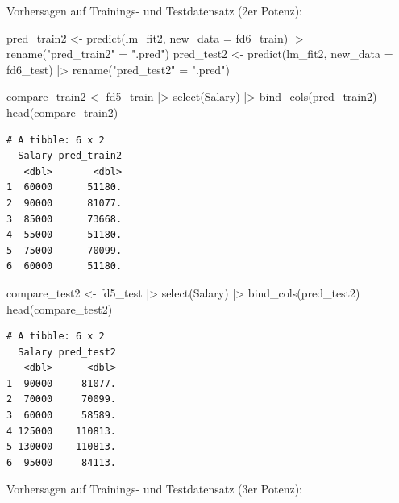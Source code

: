 \documentclass[
  letterpaper,
  DIV=11,
  numbers=noendperiod]{scrartcl}
\newenvironment{Shaded}{\begin{snugshade}}{\end{snugshade}}
\newcommand{\AttributeTok}[1]{\textcolor[rgb]{0.40,0.45,0.13}{#1}}
\newcommand{\FunctionTok}[1]{\textcolor[rgb]{0.28,0.35,0.67}{#1}}
\newcommand{\NormalTok}[1]{\textcolor[rgb]{0.00,0.23,0.31}{#1}}
\newcommand{\OtherTok}[1]{\textcolor[rgb]{0.00,0.23,0.31}{#1}}
\newcommand{\SpecialCharTok}[1]{\textcolor[rgb]{0.37,0.37,0.37}{#1}}
\newcommand{\StringTok}[1]{\textcolor[rgb]{0.13,0.47,0.30}{#1}}
\begin{document}
Vorhersagen auf Trainings- und Testdatensatz (2er Potenz):

\begin{Shaded}
\begin{Highlighting}[]
\NormalTok{pred\_train2 }\OtherTok{\textless{}{-}} \FunctionTok{predict}\NormalTok{(lm\_fit2, }\AttributeTok{new\_data =}\NormalTok{ fd6\_train) }\SpecialCharTok{|\textgreater{}} \FunctionTok{rename}\NormalTok{(}\StringTok{"pred\_train2"} \OtherTok{=} \StringTok{".pred"}\NormalTok{)}
\NormalTok{pred\_test2 }\OtherTok{\textless{}{-}} \FunctionTok{predict}\NormalTok{(lm\_fit2, }\AttributeTok{new\_data =}\NormalTok{ fd6\_test) }\SpecialCharTok{|\textgreater{}}  \FunctionTok{rename}\NormalTok{(}\StringTok{"pred\_test2"} \OtherTok{=} \StringTok{".pred"}\NormalTok{)}

\NormalTok{compare\_train2 }\OtherTok{\textless{}{-}}\NormalTok{ fd5\_train }\SpecialCharTok{|\textgreater{}} 
  \FunctionTok{select}\NormalTok{(Salary) }\SpecialCharTok{|\textgreater{}} 
  \FunctionTok{bind\_cols}\NormalTok{(pred\_train2)}
\FunctionTok{head}\NormalTok{(compare\_train2)}
\end{Highlighting}
\end{Shaded}

\begin{verbatim}
# A tibble: 6 x 2
  Salary pred_train2
   <dbl>       <dbl>
1  60000      51180.
2  90000      81077.
3  85000      73668.
4  55000      51180.
5  75000      70099.
6  60000      51180.
\end{verbatim}

\begin{Shaded}
\begin{Highlighting}[]
\NormalTok{compare\_test2 }\OtherTok{\textless{}{-}}\NormalTok{ fd5\_test }\SpecialCharTok{|\textgreater{}} 
  \FunctionTok{select}\NormalTok{(Salary) }\SpecialCharTok{|\textgreater{}} 
  \FunctionTok{bind\_cols}\NormalTok{(pred\_test2)}
\FunctionTok{head}\NormalTok{(compare\_test2)}
\end{Highlighting}
\end{Shaded}

\begin{verbatim}
# A tibble: 6 x 2
  Salary pred_test2
   <dbl>      <dbl>
1  90000     81077.
2  70000     70099.
3  60000     58589.
4 125000    110813.
5 130000    110813.
6  95000     84113.
\end{verbatim}

Vorhersagen auf Trainings- und Testdatensatz (3er Potenz):
\end{document}
